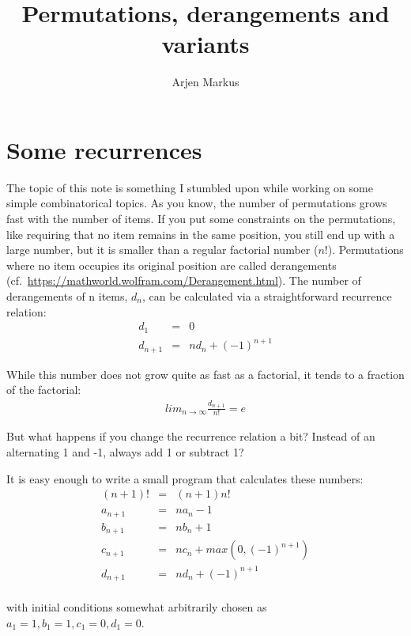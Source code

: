 \documentclass[onecolumn]{article}
\begin{document}
\title{Permutations, derangements and variants}

\author{Arjen Markus}

\maketitle

\section*{Some recurrences}
The topic of this note is something I stumbled upon while working on some simple combinatorical topics. As you know,
the number of permutations grows fast with the number of items. If you put some constraints on the permutations,
like requiring that no item remains in the same position, you still end up with a large number, but it is smaller
than a regular factorial number ($n!$). Permutations where no item occupies its original position are called
derangements (cf.\ \url{https://mathworld.wolfram.com/Derangement.html}). The number of derangements of n items, $d_n$, can be calculated via
a straightforward recurrence relation:
\begin{eqnarray}
\nonumber d_1     &=& 0 \\
\nonumber d_{n+1} &=& n d_n + (-1)^{n+1}
\end{eqnarray}

While this number does not grow quite as fast as a factorial, it tends to a fraction of the factorial:
\begin{eqnarray}
\nonumber lim_{n \rightarrow \infty} \frac{d_{n+1}}{n!} = e
\end{eqnarray}

But what happens if you change the recurrence relation a bit? Instead of an alternating 1 and -1, always add 1 or subtract 1?

It is easy enough to write a small program that calculates these numbers:
\begin{eqnarray}
\nonumber (n+1)!  &=& (n+1) n!           \\
\nonumber a_{n+1} &=& n a_n - 1          \\
\nonumber b_{n+1} &=& n b_n + 1          \\
\nonumber c_{n+1} &=& n c_n + max(0, (-1)^{n+1}) \\
\nonumber d_{n+1} &=& n d_n + (-1)^{n+1} \\
\end{eqnarray}

\noindent with initial conditions somewhat arbitrarily chosen as $a_1 = 1, b_1 = 1, c_1 = 0, d_1 = 0$.
\end{document}
